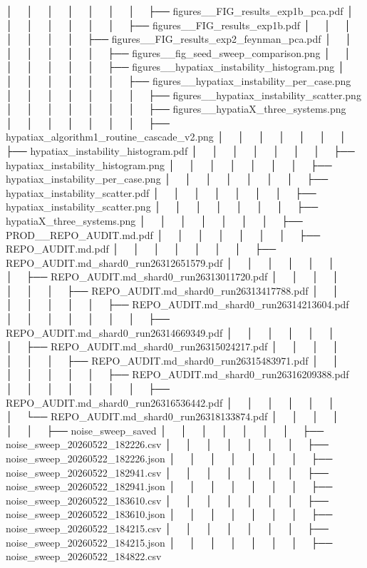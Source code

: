 │   │       │   │   │   │   │   ├── figures__FIG_results_exp1b_pca.pdf
│   │       │   │   │   │   │   ├── figures__FIG_results_exp1b.pdf
│   │       │   │   │   │   │   ├── figures__FIG_results_exp2_feynman_pca.pdf
│   │       │   │   │   │   │   ├── figures__fig_seed_sweep_comparison.png
│   │       │   │   │   │   │   ├── figures__hypatiax_instability_histogram.png
│   │       │   │   │   │   │   ├── figures__hypatiax_instability_per_case.png
│   │       │   │   │   │   │   ├── figures__hypatiax_instability_scatter.png
│   │       │   │   │   │   │   ├── figures__hypatiaX_three_systems.png
│   │       │   │   │   │   │   ├── hypatiax_algorithm1_routine_cascade_v2.png
│   │       │   │   │   │   │   ├── hypatiax_instability_histogram.pdf
│   │       │   │   │   │   │   ├── hypatiax_instability_histogram.png
│   │       │   │   │   │   │   ├── hypatiax_instability_per_case.png
│   │       │   │   │   │   │   ├── hypatiax_instability_scatter.pdf
│   │       │   │   │   │   │   ├── hypatiax_instability_scatter.png
│   │       │   │   │   │   │   ├── hypatiaX_three_systems.png
│   │       │   │   │   │   │   ├── PROD__REPO_AUDIT.md.pdf
│   │       │   │   │   │   │   ├── REPO_AUDIT.md.pdf
│   │       │   │   │   │   │   ├── REPO_AUDIT.md_shard0_run26312651579.pdf
│   │       │   │   │   │   │   ├── REPO_AUDIT.md_shard0_run26313011720.pdf
│   │       │   │   │   │   │   ├── REPO_AUDIT.md_shard0_run26313417788.pdf
│   │       │   │   │   │   │   ├── REPO_AUDIT.md_shard0_run26314213604.pdf
│   │       │   │   │   │   │   ├── REPO_AUDIT.md_shard0_run26314669349.pdf
│   │       │   │   │   │   │   ├── REPO_AUDIT.md_shard0_run26315024217.pdf
│   │       │   │   │   │   │   ├── REPO_AUDIT.md_shard0_run26315483971.pdf
│   │       │   │   │   │   │   ├── REPO_AUDIT.md_shard0_run26316209388.pdf
│   │       │   │   │   │   │   ├── REPO_AUDIT.md_shard0_run26316536442.pdf
│   │       │   │   │   │   │   └── REPO_AUDIT.md_shard0_run26318133874.pdf
│   │       │   │   │   │   ├── noise_sweep_saved
│   │       │   │   │   │   │   ├── noise_sweep_20260522_182226.csv
│   │       │   │   │   │   │   ├── noise_sweep_20260522_182226.json
│   │       │   │   │   │   │   ├── noise_sweep_20260522_182941.csv
│   │       │   │   │   │   │   ├── noise_sweep_20260522_182941.json
│   │       │   │   │   │   │   ├── noise_sweep_20260522_183610.csv
│   │       │   │   │   │   │   ├── noise_sweep_20260522_183610.json
│   │       │   │   │   │   │   ├── noise_sweep_20260522_184215.csv
│   │       │   │   │   │   │   ├── noise_sweep_20260522_184215.json
│   │       │   │   │   │   │   ├── noise_sweep_20260522_184822.csv
